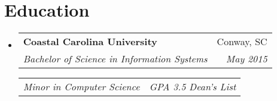 \documentclass[letterpaper,]{article}
\makeatletter
\newcommand{\resumeItem}[2]{
  \item\small{
    \textbf{#1}{: #2 \vspace{-2pt}}
  }
}
\newcommand{\resumeSubheading}[4]{
  \vspace{-1pt}\item
    \begin{tabular*}{0.97\textwidth}[t]{l@{\extracolsep{\fill}}r}
      \textbf{#1} & #2 \\
      \textit{\small#3} & \textit{\small #4} \\
    \end{tabular*}
    \vspace{-5pt}
}
\newcommand*{\resumeSubheadingItem}[2]{
  \begin{tabular*}{0.97\textwidth}[t]{l@{\extracolsep{\fill}}r}
    \textit{\small#1} & \textit{\small #2} \\
  \end{tabular*}
}
\newcommand{\resumeSubItem}[2]{\resumeItem{#1}{#2}\vspace{-4pt}}
\newcommand{\resumeSubHeadingListStart}{\begin{itemize}[leftmargin=*]}
\newcommand{\resumeSubHeadingListEnd}{\end{itemize}}
\makeatother
\begin{document}
\section{Education}
  \resumeSubHeadingListStart
    \resumeSubheading
      {Coastal Carolina University}{Conway, SC}
      {Bachelor of Science in Information Systems}{May 2015}

      \resumeSubheadingItem
      {Minor in Computer Science}{GPA 3.5 Dean's List}
      
  \resumeSubHeadingListEnd







\end{document}
